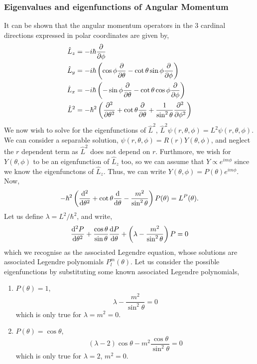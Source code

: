 \documentclass{book}
\begin{document}
\subsubsection{Eigenvalues and eigenfunctions of Angular Momentum}
It can be shown that the angular momentum operators in the 3 cardinal directions expressed in polar coordinates are given by,
\begin{align}
	\hat{L}_z & = -i\hbar \pdv{\phi} \\
	\hat{L}_y & = -i\hbar \left(\cos\phi \pdv{\theta} -\cot\theta \sin\phi \pdv{\phi}\right) \\
	\hat{L}_x & = -i\hbar \left(-\sin\phi \pdv{\theta} - \cot\theta \cos\phi \pdv{\phi}\right) \\
	\hat{L}^2 & = -\hbar^2\left(\pdv[2]{\theta} + \cot\theta\pdv{\theta} + \frac{1}{\sin^2\theta}\pdv[2]{\phi}\right)
\end{align}
We now wish to solve for the eigenfunctions of $\hat{L}^2$, $\hat{L}^2\psi(r,\theta,\phi) = L^2\psi(r,\theta,\phi)$. We can consider a separable solution, $\psi(r,\theta,\phi) = R(r)Y(\theta,\phi)$, and neglect the $r$ dependent term as $\hat{L}^2$ does not depend on $r$. Furthmore, we wish for $Y(\theta,\phi)$ to be an eigenfunction of $\hat{L}_z$ too, so we can assume that $Y \propto e^{im\phi}$ since we know the eigenfunctons of $\hat{L}_z$. Thus, we can write $Y(\theta,\phi) = P(\theta)e^{im\phi}$. Now,
\begin{equation}
	-\hbar^2\left(\dv[2]{\theta} + \cot\theta\dv{\theta} -\frac{m^2}{\sin^2\theta}\right)P(\theta) = L^P(\theta).
\end{equation}
Let us define $\lambda = L^2/\hbar^2$, and write,
\begin{equation}
	\dv[2]{P}{\theta} + \frac{\cos\theta}{\sin\theta}\dv{P}{\theta} + \left(\lambda - \frac{m^2}{\sin^2\theta}\right)P = 0
\end{equation}
which we recognise as the associated Legendre equation, whose solutions are associated Legendre polynomials $P_l^m(\theta)$. Let us consider the possible eigenfunctions by substituting some known associated Legendre polynomials,
\begin{enumerate}
	\item $P(\theta) = 1$,
	\begin{equation}
		\lambda - \frac{m^2}{\sin^2\theta} = 0
	\end{equation}
	which is only true for $\lambda = m^2 = 0$.
	\item $P(\theta) = \cos\theta$,
	\begin{equation}
		(\lambda - 2)\cos\theta - m^2\frac{\cos\theta}{\sin^2\theta} = 0
	\end{equation}
	which is only true for $\lambda = 2$, $m^2=0$.
\end{enumerate}
\end{document}
